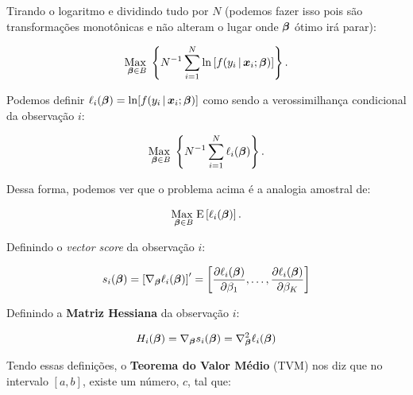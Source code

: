 \documentclass[11pt, oneside, a4paper, article]{article}
\numberwithin{equation}{section}
\begin{document}
\begin{description}
\noindent

Tirando o logaritmo e dividindo tudo por $N$ (podemos fazer isso pois são transformações monotônicas e não alteram o lugar onde $\boldsymbol{\beta}$ ótimo irá parar):

\vspace{-1 em}
\begin{align*}
\underset{\boldsymbol{\beta} \in B}{\text{Max }} 
\left\{ 
N^{-1} \sum_{i=1}^{N}
\ln \left[ f( y_{i} \, | \, \boldsymbol{x}_{i} ; \boldsymbol{\beta} ) \right]
\right\}.
\end{align*}

\noindent
Podemos definir
$\ell_{i}( \boldsymbol{\beta} ) = \ln[ f( y_{i} \, | \, \boldsymbol{x}_{i} ; \boldsymbol{\beta} ) ]$
como sendo a verossimilhança condicional da observação $i$:

\vspace{-1 em}
\begin{align*}
\underset{\boldsymbol{\beta} \in B}{\text{Max }} 
\left\{ 
N^{-1} \sum_{i=1}^{N} \ell_{i} (\boldsymbol{\beta})
\right\}.
\end{align*}

Dessa forma, podemos ver que o problema acima é a analogia amostral de:

\vspace{-1 em}
\begin{align*}
\underset{\boldsymbol{\beta} \in B}{\text{Max }} 
\text{E} \left[ 
\ell_{i} ( \boldsymbol{\beta} )
\right].
\end{align*}

Definindo o \textit{vector score} da observação $i$:

\vspace{-1 em}
\begin{align*}
s_{i} (\boldsymbol{\beta}) = 
\left[ \nabla_{\boldsymbol{\beta}} \ell_{i} (\boldsymbol{\beta}) \right]'
=
\begin{bmatrix}
	\dfrac{\partial{\ell_{i} (\ensuremath{\boldsymbol{\beta}})}}{\partial{\beta_{1}}},
	\dots,
	\dfrac{\partial{\ell_{i} (\ensuremath{\boldsymbol{\beta}})}}{\partial{\beta_{K}}}
\end{bmatrix}
\end{align*}

Definindo a \textbf{Matriz Hessiana} da observação $i$:

\vspace{-1 em}
\begin{align*}
H_{i} (\boldsymbol{\beta}) = 
\nabla_{\boldsymbol{\beta}} s_{i} (\boldsymbol{\beta}) = 
\nabla_{\boldsymbol{\beta}}^2 \ell_{i} (\boldsymbol{\beta})
\end{align*}

Tendo essas definições, o \textbf{Teorema do Valor Médio} (TVM) nos diz que no intervalo $[a, b]$, existe um número, $c$, tal que:


\end{description}
\end{document}
